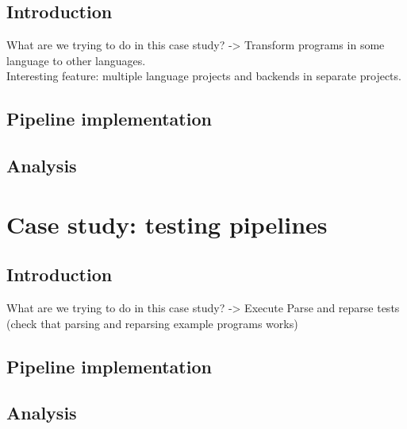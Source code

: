 \subsection{Introduction}
\label{sec:evaluation__database__introduction}
What are we trying to do in this case study?
-> Transform programs in some language to other languages.
\\
Interesting feature: multiple language projects and backends in separate projects.


\subsection{Pipeline implementation}
\label{sec:evaluation__database__implementation}


\subsection{Analysis}
\label{sec:evaluation__database__analysis}


\section{Case study: testing pipelines}
\label{sec:evaluation__testing}

\subsection{Introduction}
\label{sec:evaluation__testing__introduction}
What are we trying to do in this case study?
-> Execute Parse and reparse tests (check that parsing and reparsing example programs works)


\subsection{Pipeline implementation}
\label{sec:evaluation__testing__implementation}


\subsection{Analysis}
\label{sec:evaluation__testing__analysis}

